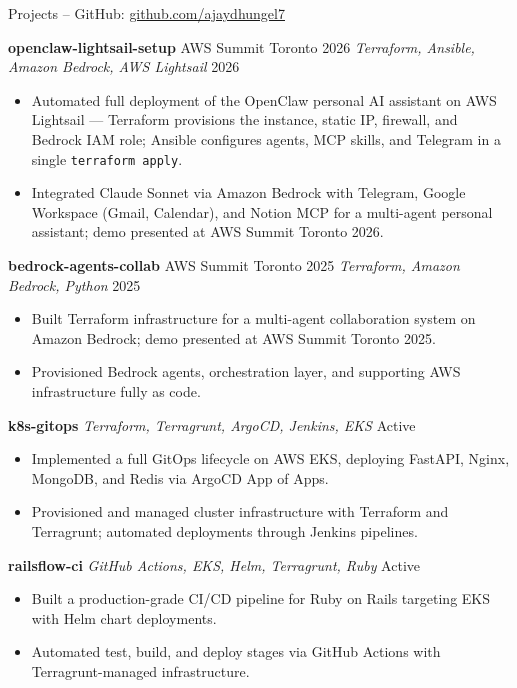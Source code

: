 \documentclass{resume}
\begin{document}
\begin{rSection}{Projects -- GitHub: \href{https://github.com/ajaydhungel7}{github.com/ajaydhungel7}}

\textbf{openclaw-lightsail-setup} \textbar{} AWS Summit Toronto 2026 \textbar{} \textit{Terraform, Ansible, Amazon Bedrock, AWS Lightsail} \hfill 2026
\begin{itemize}
    \itemsep -3pt {}
    \item Automated full deployment of the OpenClaw personal AI assistant on AWS Lightsail — Terraform provisions the instance, static IP, firewall, and Bedrock IAM role; Ansible configures agents, MCP skills, and Telegram in a single \texttt{terraform apply}.
    \item Integrated Claude Sonnet via Amazon Bedrock with Telegram, Google Workspace (Gmail, Calendar), and Notion MCP for a multi-agent personal assistant; demo presented at AWS Summit Toronto 2026.
\end{itemize}

\textbf{bedrock-agents-collab} \textbar{} AWS Summit Toronto 2025 \textbar{} \textit{Terraform, Amazon Bedrock, Python} \hfill 2025
\begin{itemize}
    \itemsep -3pt {}
    \item Built Terraform infrastructure for a multi-agent collaboration system on Amazon Bedrock; demo presented at AWS Summit Toronto 2025.
    \item Provisioned Bedrock agents, orchestration layer, and supporting AWS infrastructure fully as code.
\end{itemize}

\textbf{k8s-gitops} \textbar{} \textit{Terraform, Terragrunt, ArgoCD, Jenkins, EKS} \hfill Active
\begin{itemize}
    \itemsep -3pt {}
    \item Implemented a full GitOps lifecycle on AWS EKS, deploying FastAPI, Nginx, MongoDB, and Redis via ArgoCD App of Apps.
    \item Provisioned and managed cluster infrastructure with Terraform and Terragrunt; automated deployments through Jenkins pipelines.
\end{itemize}

\textbf{railsflow-ci} \textbar{} \textit{GitHub Actions, EKS, Helm, Terragrunt, Ruby} \hfill Active
\begin{itemize}
    \itemsep -3pt {}
    \item Built a production-grade CI/CD pipeline for Ruby on Rails targeting EKS with Helm chart deployments.
    \item Automated test, build, and deploy stages via GitHub Actions with Terragrunt-managed infrastructure.
\end{itemize}

\end{rSection}
\end{document}

